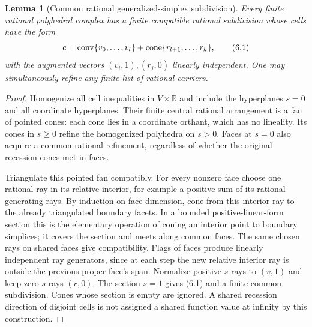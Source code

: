\documentclass[11pt]{article}
\newtheorem{lemma}[theorem]{Lemma}
\newcommand{\R}{\mathbb R}\newcommand{\Q}{\mathbb Q}\newcommand{\Z}{\mathbb Z}
\newcommand{\conv}{\operatorname{conv}}\newcommand{\ri}{\operatorname{relint}}
\begin{document}
\begin{lemma}[Common rational generalized-simplex subdivision]\label{l:simplex}
Every finite rational polyhedral complex has a finite compatible rational subdivision whose cells have the form
\[
 c=\conv\{v_0,\ldots,v_l\}+\cone\{r_{l+1},\ldots,r_k\},
                                                                    \tag{6.1}
\]
with the augmented vectors $(v_i,1),(r_j,0)$ linearly independent. One may simultaneously refine any finite list of rational carriers.
\end{lemma}
\begin{proof}
Homogenize all cell inequalities in $V\times\R$ and include the hyperplanes $s=0$ and all coordinate hyperplanes. Their finite central rational arrangement is a fan of pointed cones: each cone lies in a coordinate orthant, which has no lineality. Its cones in $s\geq0$ refine the homogenized polyhedra on $s>0$. Faces at $s=0$ also acquire a common rational refinement, regardless of whether the original recession cones met in faces.

Triangulate this pointed fan compatibly. For every nonzero face choose one rational ray in its relative interior, for example a positive sum of its rational generating rays. By induction on face dimension, cone from this interior ray to the already triangulated boundary facets. In a bounded positive-linear-form section this is the elementary operation of coning an interior point to boundary simplices; it covers the section and meets along common faces. The same chosen rays on shared faces give compatibility. Flags of faces produce linearly independent ray generators, since at each step the new relative interior ray is outside the previous proper face's span. Normalize positive-$s$ rays to $(v,1)$ and keep zero-$s$ rays $(r,0)$. The section $s=1$ gives (6.1) and a finite common subdivision. Cones whose section is empty are ignored. A shared recession direction of disjoint cells is not assigned a shared function value at infinity by this construction.
\end{proof}
\end{document}
